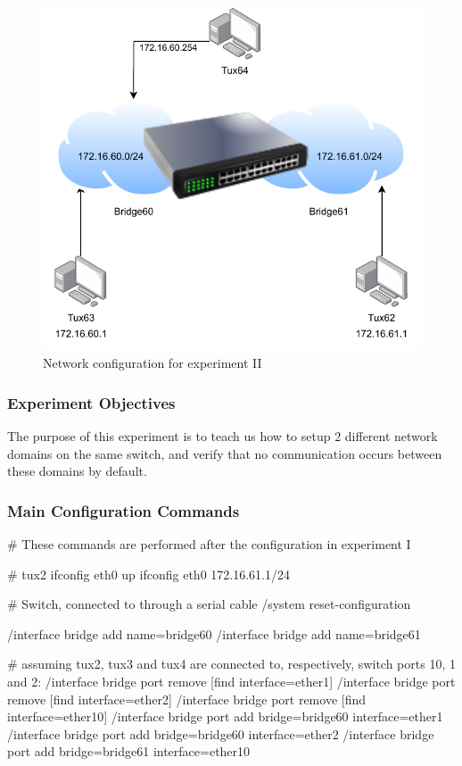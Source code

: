 \documentclass[11pt,a4paper,twocolumn]{article}
\begin{document}
\begin{figure}[H]
    \centering
    \includegraphics[scale=0.5]{experiment2}
    \caption{Network configuration for experiment II}
\end{figure}

\subsubsection{Experiment Objectives}

The purpose of this experiment is to teach us how to setup 2 different network domains on the same switch, and verify that no communication occurs between these domains by default.

\subsubsection{Main Configuration Commands}

\begin{code-bash}
# These commands are performed after the configuration in experiment I

# tux2
ifconfig eth0 up
ifconfig eth0 172.16.61.1/24

# Switch, connected to through a serial cable
/system reset-configuration

/interface bridge add name=bridge60
/interface bridge add name=bridge61

# assuming tux2, tux3 and tux4 are connected to, respectively, switch ports 10, 1 and 2:
/interface bridge port remove [find interface=ether1]
/interface bridge port remove [find interface=ether2]
/interface bridge port remove [find interface=ether10]
/interface bridge port add bridge=bridge60 interface=ether1
/interface bridge port add bridge=bridge60 interface=ether2
/interface bridge port add bridge=bridge61 interface=ether10
\end{code-bash}
\end{document}
